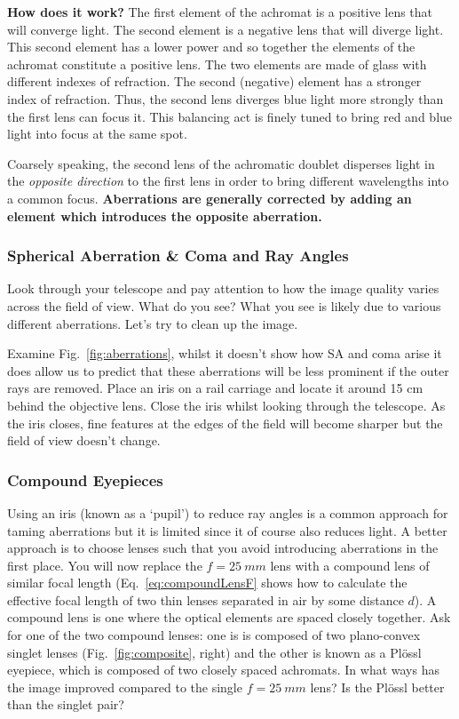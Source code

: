 \documentclass[a4paper]{report}
\begin{document}
\textbf{How does it work?} 
The first element of the achromat is a positive lens that will converge light. 
The second element is a negative lens that will diverge light.
This second element has a lower power and so together the elements of the achromat constitute a positive lens. 
The two elements are made of glass with different indexes of refraction. 
The second (negative) element has a stronger index of refraction. 
Thus, the second lens diverges blue light more strongly than the first lens can focus it.
This balancing act is finely tuned to bring red and blue light into focus at the same spot.

Coarsely speaking, the second lens of the achromatic doublet disperses light in the \textit{opposite direction} to the first lens in order to bring different wavelengths into a common focus. 
\textbf{Aberrations are generally corrected by adding an element which introduces the opposite aberration.}






\subsubsection{Spherical Aberration \& Coma and Ray Angles}
Look through your telescope and pay attention to how the image quality varies across the field of view. 
What do you see?
What you see is likely due to various different aberrations. 
Let's try to clean up the image. 

Examine Fig.~\ref{fig:aberrations}, whilst it doesn't show how SA and coma arise it does allow us to predict that these aberrations will be less prominent if the outer rays are removed. 
Place an iris on a rail carriage and locate it around 15 cm behind the objective lens. 
Close the iris whilst looking through the telescope. 
As the iris closes, fine features at the edges of the field will become sharper but the field of view doesn't change. 




\subsubsection{Compound Eyepieces}
Using an iris (known as a `pupil') to reduce ray angles is a common approach for taming aberrations but it is limited since it of course also reduces light. 
A better approach is to choose lenses such that you avoid introducing aberrations in the first place. 
You will now replace the $f=25~mm$ lens with a compound lens of similar focal length (Eq.~\ref{eq:compoundLensF} shows how to calculate the effective focal length of two thin lenses separated in air by some distance $d$). 
A compound lens is one where the optical elements are spaced closely together. 
Ask for one of the two compound lenses: one is is composed of two plano-convex singlet lenses (Fig.~\ref{fig:composite}, right)
and the other is known as a Pl\"{o}ssl eyepiece, which is composed of two closely spaced achromats. 
In what ways has the image improved compared to the single $f=25~mm$ lens?
Is the Pl\"{o}ssl better than the singlet pair?
\end{document}
